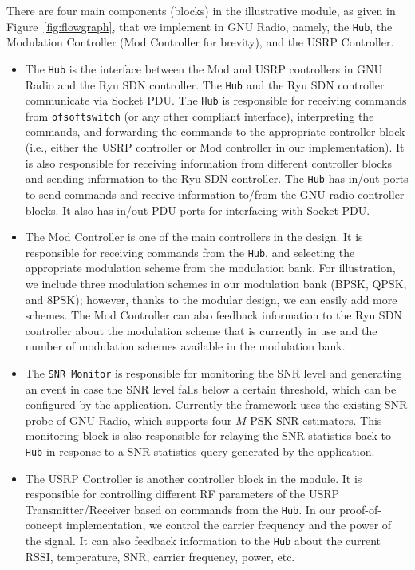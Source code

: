 There are four main components (blocks) in the illustrative \crossflow module, as given in Figure~\ref{fig:flowgraph}, that we implement in GNU Radio, namely, the \texttt{\crossflow Hub}, the Modulation Controller (Mod Controller for brevity), and the USRP Controller.
\begin{itemize}
\item The \texttt{\crossflow Hub} is the interface between the Mod and USRP controllers in GNU Radio and the Ryu SDN controller. The \texttt{\crossflow Hub} and the Ryu SDN controller communicate via Socket PDU. The \texttt{\crossflow Hub} is responsible for receiving commands from \texttt{ofsoftswitch} (or any other compliant interface), interpreting the commands, and forwarding the commands to the appropriate controller block (i.e., either the USRP controller or Mod controller in our implementation). It is also responsible for receiving information from different controller blocks and sending information to the Ryu SDN controller. The \texttt{\crossflow Hub} has in/out ports to send commands and receive information to/from the GNU radio controller blocks. It also has in/out PDU ports for interfacing with Socket PDU.
\item The Mod Controller is one of the main controllers in the design. It is responsible for receiving commands from the \texttt{\crossflow Hub}, and selecting the appropriate modulation scheme from the modulation bank. For illustration, we include three modulation schemes in our modulation bank (BPSK, QPSK, and 8PSK); however, thanks to the modular design, we can easily add more schemes. The Mod Controller can also feedback information to the Ryu SDN controller about the modulation scheme that is currently in use and the number of modulation schemes available in the modulation bank.
\item The \texttt{SNR Monitor} is responsible for monitoring the SNR level and generating an event in case the SNR level falls below a certain threshold, which can be configured by the application. Currently the framework uses the existing SNR probe of GNU Radio, which supports four $M$-PSK SNR estimators. This monitoring block is also responsible for relaying the SNR statistics back to \texttt{\crossflow Hub} in response to a SNR statistics query generated by the application.
\item The USRP Controller is another controller block in the \crossflow module. It is responsible for controlling different RF parameters of the USRP Transmitter/Receiver based on commands from the \texttt{\crossflow Hub}. In our proof-of-concept implementation, we control the carrier frequency and the power of the signal. It can also feedback information to the \texttt{\crossflow Hub} about the current RSSI, temperature, SNR, carrier frequency, power, etc.
\end{itemize}

